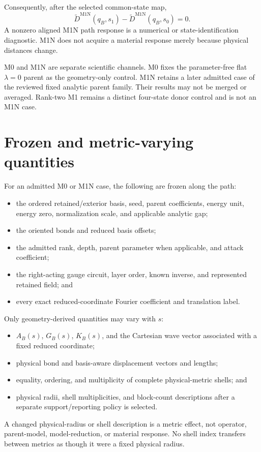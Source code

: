\documentclass[11pt]{article}
\begin{document}
Consequently, after the selected common-state map,
\begin{equation}
 \widetilde D^{\mathrm{M1N}}(q_B,s_1)-
 \widetilde D^{\mathrm{M1N}}(q_B,s_0)=0.
\end{equation}
A nonzero aligned M1N path response is a numerical or state-identification diagnostic.
M1N does not acquire a material response merely because physical distances change.

M0 and M1N are separate scientific channels.  M0 fixes the parameter-free flat
$\lambda=0$ parent as the geometry-only control.  M1N retains a later admitted case of
the reviewed fixed analytic parent family.  Their results may not be merged or averaged.
Rank-two M1 remains a distinct four-state donor control and is not an M1N case.

\section{Frozen and metric-varying quantities}

For an admitted M0 or M1N case, the following are frozen along the path:
\begin{itemize}[leftmargin=*]
  \item the ordered retained/exterior basis, seed, parent coefficients, energy unit,
    energy zero, normalization scale, and applicable analytic gap;
  \item the oriented bonds and reduced basis offsets;
  \item the admitted rank, depth, parent parameter when applicable, and attack
    coefficient;
  \item the right-acting gauge circuit, layer order, known inverse, and represented
    retained field; and
  \item every exact reduced-coordinate Fourier coefficient and translation label.
\end{itemize}
Only geometry-derived quantities may vary with $s$:
\begin{itemize}[leftmargin=*]
  \item $A_B(s)$, $G_B(s)$, $K_B(s)$, and the Cartesian wave vector associated with a
    fixed reduced coordinate;
  \item physical bond and basis-aware displacement vectors and lengths;
  \item equality, ordering, and multiplicity of complete physical-metric shells; and
  \item physical radii, shell multiplicities, and block-count descriptions after a
    separate support/reporting policy is selected.
\end{itemize}
A changed physical-radius or shell description is a metric effect, not operator,
parent-model, model-reduction, or material response.  No shell index transfers between
metrics as though it were a fixed physical radius.
\end{document}
